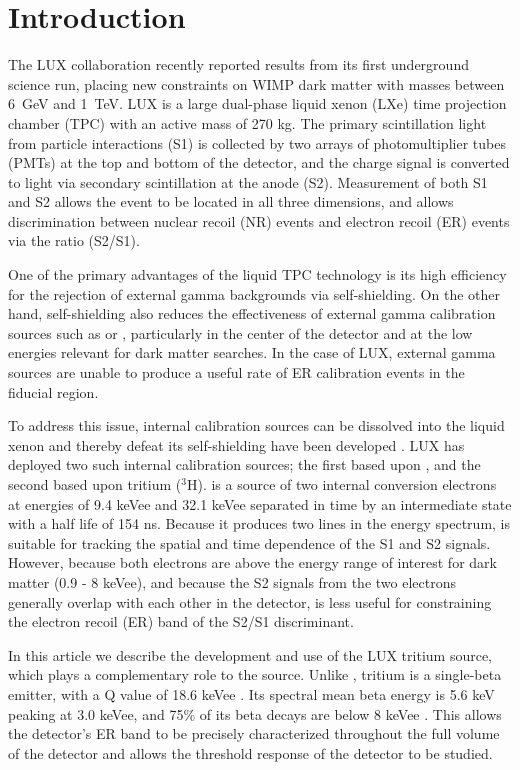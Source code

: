 \section{Introduction}

The LUX collaboration recently reported results from its first underground science run, placing new constraints on WIMP dark matter with masses between 6~GeV and 1~TeV\cite{LUX_PRL}. LUX is a large dual-phase liquid xenon (LXe) time projection chamber (TPC) with an active mass of 270 kg. The primary scintillation light from particle interactions (S1) is collected by two arrays of photomultiplier tubes (PMTs) at the top and bottom of the detector, and the charge signal is converted to light via secondary scintillation at the anode (S2). Measurement of both S1 and S2 allows the event to be located in all three dimensions, and allows discrimination between nuclear recoil (NR) events and electron recoil (ER) events via the ratio (S2/S1).

One of the primary advantages of the liquid TPC technology is its high efficiency for the rejection of external gamma backgrounds via self-shielding. On the other hand, self-shielding also reduces the effectiveness of external gamma calibration sources such as \cssrc or \thsrc, particularly in the center of the detector and at the low energies relevant for dark matter searches. In the case of LUX, external gamma sources are unable to produce a useful rate of ER calibration events in the fiducial region.  

To address this issue, internal calibration sources can be dissolved into the liquid xenon and thereby defeat its self-shielding have been developed \cite{Kastens:2009rt}. LUX has deployed two such internal calibration sources; the first based upon \krsrc, and the second based upon tritium ($^{3}$H). \krsrc is a source of two internal conversion electrons at energies of 9.4 keVee and 32.1 keVee separated in time by an intermediate state with a half life of 154 ns\cite{83Kr_HalfLife_1}\cite{83Kr_HalfLife_2}. Because it produces two lines in the energy spectrum, \krsrc is suitable for tracking the spatial and time dependence of the S1 and S2 signals. However, because both \krsrc electrons are above the energy range of interest for dark matter (0.9 - 8 keVee), and because the S2 signals from the two electrons generally overlap with each other in the detector,  \krsrc is less useful for constraining the electron recoil (ER) band of the S2/S1 discriminant. 

In this article we describe the development and use of the LUX tritium source, which plays a complementary role to the \krsrc source. Unlike \krsrc, tritium is a single-beta emitter, with a Q value of 18.6 keVee \cite{Tritium_Q}. Its spectral mean beta energy is 5.6 keV \cite{Tritium_Mean} peaking at 3.0 keVee, and 75\% of its beta decays are below 8 keVee \cite{Tritium_Eq}. This allows the detector's ER band to be precisely characterized throughout the full volume of the detector and allows the threshold response of the detector to be studied.

